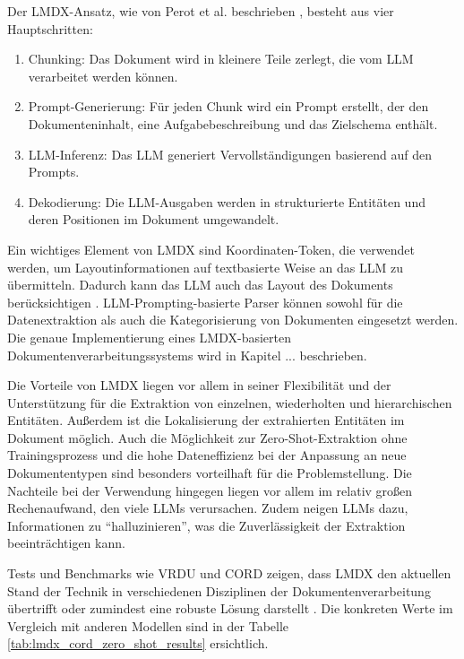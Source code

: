 Der \gls{LMDX}-Ansatz, wie von Perot et al. beschrieben \cite{PerotVincent2024LLMD}, besteht aus vier Hauptschritten:

\begin{enumerate}
    \item Chunking: Das Dokument wird in kleinere Teile zerlegt, die vom \gls{LLM} verarbeitet werden können.
    \item Prompt-Generierung: Für jeden Chunk wird ein Prompt erstellt, der den Dokumenteninhalt, eine Aufgabebeschreibung und das Zielschema enthält.
    \item \gls{LLM}-Inferenz: Das \gls{LLM} generiert Vervollständigungen basierend auf den Prompts.
    \item Dekodierung: Die \gls{LLM}-Ausgaben werden in strukturierte Entitäten und deren Positionen im Dokument umgewandelt.
\end{enumerate}

Ein wichtiges Element von \gls{LMDX} sind Koordinaten-Token, die verwendet werden, um Layoutinformationen auf textbasierte Weise an das \gls{LLM} zu übermitteln. Dadurch kann das \gls{LLM} auch das Layout des Dokuments berücksichtigen \cite{PerotVincent2024LLMD}. LLM-Prompting-basierte Parser können sowohl für die Datenextraktion als auch die Kategorisierung von Dokumenten eingesetzt werden. Die genaue Implementierung eines \gls{LMDX}-basierten Dokumentenverarbeitungssystems wird in Kapitel ... beschrieben.

Die Vorteile von \gls{LMDX} liegen vor allem in seiner Flexibilität und der Unterstützung für die Extraktion von einzelnen, wiederholten und hierarchischen Entitäten. Außerdem ist die Lokalisierung der extrahierten Entitäten im Dokument möglich. Auch die Möglichkeit zur Zero-Shot-Extraktion ohne Trainingsprozess und die hohe Dateneffizienz bei der Anpassung an neue Dokumententypen sind besonders vorteilhaft für die Problemstellung. Die Nachteile bei der Verwendung hingegen liegen vor allem im relativ großen Rechenaufwand, den viele \glspl{LLM} verursachen. Zudem neigen \glspl{LLM} dazu, Informationen zu ``halluzinieren'', was die Zuverlässigkeit der Extraktion beeinträchtigen kann.

Tests und Benchmarks wie VRDU \cite{WangZilong2023VABf} und CORD \cite{park2019cord} zeigen, dass \gls{LMDX} den aktuellen Stand der Technik in verschiedenen Disziplinen der Dokumentenverarbeitung übertrifft oder zumindest eine robuste Lösung darstellt \cite{PerotVincent2024LLMD}. Die konkreten Werte im Vergleich mit anderen Modellen sind in der Tabelle \ref{tab:lmdx_cord_zero_shot_results} ersichtlich.

